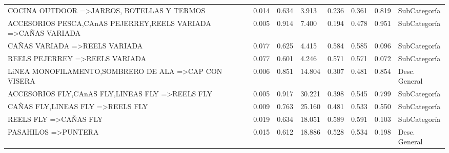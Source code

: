 \documentclass[]{article}
\begin{document}
\begin{landscape}
\begin{table}[htbp]
\begin{tabular}{llllllll}
				{COCINA OUTDOOR} =\textgreater {JARROS, BOTELLAS Y TERMOS} & 0.014 & 0.634 & 3.913 & 0.236 & 0.361 & 0.819 & SubCategoría \\
				{ACCESORIOS PESCA,CAnAS PEJERREY,REELS VARIADA} =\textgreater {CAÑAS VARIADA} & 0.005 & 0.914 & 7.400 & 0.194 & 0.478 & 0.951 & SubCategoría \\
				{CAÑAS VARIADA} =\textgreater {REELS VARIADA} & 0.077 & 0.625 & 4.415 & 0.584 & 0.585 & 0.096 & SubCategoría \\
				{REELS PEJERREY} =\textgreater {REELS VARIADA} & 0.077 & 0.601 & 4.246 & 0.571 & 0.571 & 0.072 & SubCategoría \\
				{LiNEA MONOFILAMENTO,SOMBRERO DE ALA} =\textgreater {CAP CON VISERA} & 0.006 & 0.851 & 14.804 & 0.307 & 0.481 & 0.854 & Desc. General \\
				{ACCESORIOS FLY,CAnAS FLY,LINEAS FLY} =\textgreater {REELS FLY} & 0.005 & 0.917 & 30.221 & 0.398 & 0.545 & 0.799 & SubCategoría \\
				{CAÑAS FLY,LINEAS FLY} =\textgreater {REELS FLY} & 0.009 & 0.763 & 25.160 & 0.481 & 0.533 & 0.550 & SubCategoría \\
				{REELS FLY} =\textgreater {CAÑAS FLY} & 0.019 & 0.634 & 18.051 & 0.589 & 0.591 & 0.103 & SubCategoría \\
				{PASAHILOS} =\textgreater {PUNTERA} & 0.015 & 0.612 & 18.886 & 0.528 & 0.534 & 0.198 & Desc. General \\		 			
			\end{tabular}%
			\label{Tab_Reg_Habituales}%
		\end{table}%
		
	\end{landscape}
	\restoregeometry
	
	
	
\end{document}
